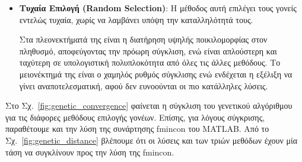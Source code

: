 \documentclass[a4paper,12pt]{article}
\begin{document}
\begin{itemize}
    \item \textbf{Τυχαία Επιλογή (Random Selection)}:
    Η μέθοδος αυτή επιλέγει τους γονείς εντελώς τυχαία, χωρίς να λαμβάνει υπόψη την καταλληλότητά τους.

    Στα πλεονεκτήματά της είναι η διατήρηση υψηλής ποικιλομορφίας στον πληθυσμό, αποφεύγοντας την πρόωρη σύγκλιση,
    ενώ είναι απλούστερη και ταχύτερη σε υπολογιστική πολυπλοκότητα από όλες τις άλλες μεθόδους. Το μειονέκτημά της
    είναι ο χαμηλός ρυθμός σύγκλισης ενώ ενδέχεται η εξέλιξη να γίνει αναποτελεσματική, αφού δεν ευνοούνται οι πιο 
    κατάλληλες λύσεις.
    
\end{itemize}

Στο Σχ.~\ref{fig:genetic_convergence} φαίνεται η σύγκλιση του γενετικού αλγόριθμου για τις διάφορες μεθόδους
επιλογής γονέων. Επίσης, για λόγους σύγκρισης, παραθέτουμε και την λύση της συνάρτησης 
fmincon του MATLAB.
Από το Σχ.~\ref{fig:genetic_distance} βλέπουμε ότι οι λύσεις και των τριών μεθόδων έχουν μία τάση να συγκλίνουν 
προς την λύση της fmincon.
\end{document}
